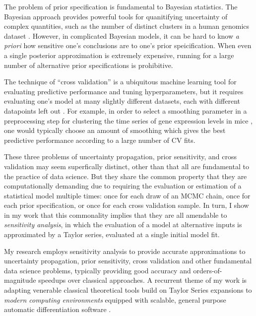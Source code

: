 The problem of prior specification is fundamental to Bayesian statistics. The
Bayesian approach provides powerful tools for quanitifying uncertainty of
complex quantities, such as the number of distinct clusters in a human genomics
dataset \citep{huang:2011:haplotype, raj:2014:faststructure}.  However, in
complicated Bayesian models, it can be hard to know {\em a priori} how sensitive
one's conclusions are to one's prior speicification.  When even a single
posterior approximation is extremely expensive, running for a large number of
alternative prior specifications is prohibitive.

The technique of ``cross validation'' is a ubiquitous machine learning tool
for evaluating predictive performance and tuning hyperparameters, but it
requires evaluating one's model at many slightly different datasets, each with
different datapoints left out \citep{barnard:1974:cvchoicediscussion,
friedman:2001:esl}.  For example, in order to select a smoothing parameter in a
preprocessing step for clustering the time series of gene expression levels in
mice \citep{shoemaker:2015:ultrasensitive}, one would typically choose an amount
of smoothing which gives the best predictive performance according to a large
number of CV fits.

These three problems of uncertainty propagation, prior sensitivity, and cross
validation may seem superfically distinct, other than that all are fundamental
to the practice of data science.  But they share the common property that they
are computationally demanding due to requiring the evaluation or estimation of a
statistical model multiple times: once for each draw of an MCMC chain, once for
each prior specification, or once for each cross validation sample. In turn, I
show in my work that this commonality implies that they are all amendable to
{\em sensitivity analysis}, in which the evaluation of a model at alternative
inputs is approximated by a Taylor series, evaluated at a single initial model
fit.

My research employs sensitivity analysis to provide accurate approximations to
uncertainty propagation, prior sensitivity, cross validation and other
fundamental data science problems, typically providing good accuracy and
orders-of-magnitude speedups over classical approaches.  A recurrent theme of my
work is adapting venerable classical theoretical tools build on Taylor Series
expansions  \citep{reeds:1976:thesis, gustafson:1996:localposterior,
opper:2001:advancedmeanfield} to {\em modern computing environments} equipped
with scalable, general purpose automatic differentiation software
\citep{baydin:2015:automatic, carpenter:2015:stanmath}.


